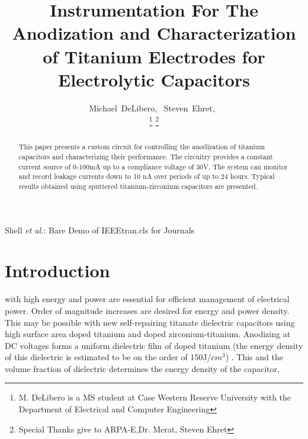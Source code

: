 \documentclass[journal]{IEEEtran}
\begin{document}
\title{Instrumentation For The Anodization and Characterization of Titanium Electrodes for Electrolytic Capacitors}

\author{Michael~DeLibero,~
       {Steven~Ehret,~
    }%

\thanks{M. DeLibero is a MS student at Case Western Reserve University with the Department
of Electrical and Computer Engineering}%
\thanks{Special Thanks give to ARPA-E,Dr. Merat, Steven Ehret}}

%
{Shell \MakeLowercase{\textit{et al.}}: Bare Demo of IEEEtran.cls for Journals}

\maketitle

\begin{abstract}
This paper presents a custom circuit for controlling the anodization of titanium capacitors and characterizing their performance. The circuitry provides a constant current source of 0-100mA up to a compliance voltage of 30V. The system can monitor and record leakage currents down to 10 nA over periods of up to 24 hours. Typical results obtained using sputtered titanium-zirconium capacitors are presented.
\end{abstract}

\begin{IEEEkeywords}
\end{IEEEkeywords}

\IEEEpeerreviewmaketitle

\section{Introduction}

 with high energy and power are essential for efficient management of electrical power.  Order of magnitude increases are desired for energy and power density. This may be possible with new self-repairing titanate dielectric capacitors using high surface area doped titanium and doped zirconium-titanium.  Anodizing at DC voltages forms a uniform dielectric film of doped titanium (the energy density of this dielectric is estimated to be on the order of 150J/$cm^3$) \cite{tiSponge}. This and the volume fraction of dielectric determines the energy density of the capacitor.
\end{document}
